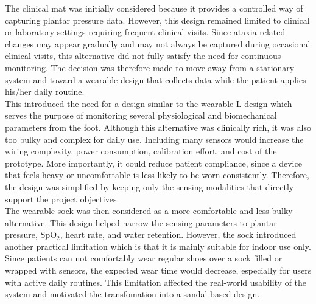 The clinical mat was initially considered because it provides a controlled way of capturing plantar pressure data. However, this design remained limited to clinical or laboratory settings requiring frequent clinical visits. Since ataxia-related changes may appear gradually and may not always be captured during occasional clinical visits, this alternative did not fully satisfy the need for continuous monitoring. The decision was therefore made to move away from a stationary system and toward a wearable design that collects data while the patient applies his/her daily routine. \\


\noindent This introduced the need for a design similar to the wearable L design which serves the purpose of monitoring several physiological and biomechanical parameters from the foot. Although this alternative was clinically rich, it was also too bulky and complex for daily use. Including many sensors would increase the wiring complexity, power consumption, calibration effort, and cost of the prototype. More importantly, it could reduce patient compliance, since a device that feels heavy or uncomfortable is less likely to be worn consistently. Therefore, the design was simplified by keeping only the sensing modalities that directly support the project objectives. \\

The wearable sock was then considered as a more comfortable and less bulky alternative. This design helped narrow the sensing parameters to plantar pressure, SpO$_2$, heart rate, and water retention. However, the sock introduced another practical limitation which is that it is mainly suitable for indoor use only. Since patients can not comfortably wear regular shoes over a  sock filled or wrapped with sensors, the expected wear time would decrease, especially for users with active daily routines. This limitation affected the real-world usability of the system and motivated the transfomation into a sandal-based design. \\


